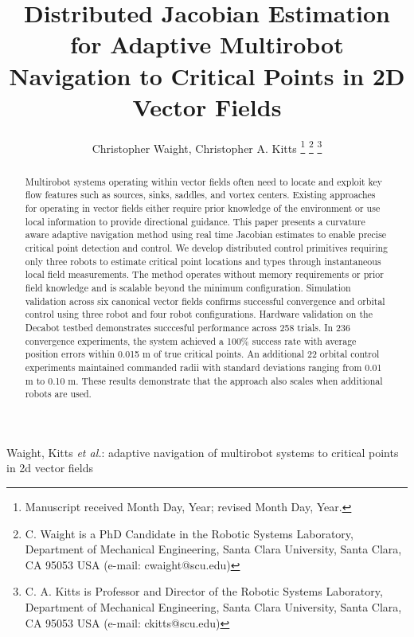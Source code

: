 \documentclass[lettersize,journal]{IEEEtran}
\begin{document}
\title{Distributed Jacobian Estimation for Adaptive Multirobot Navigation to Critical Points in 2D Vector Fields}
\author{Christopher Waight, Christopher A. Kitts 
\thanks{Manuscript received Month Day, Year; revised Month Day, Year.}
\thanks{C. Waight is a PhD Candidate in the Robotic Systems Laboratory, Department of Mechanical Engineering, Santa Clara University, Santa Clara, CA 95053 USA (e-mail: cwaight@scu.edu)}
\thanks{C. A. Kitts is Professor and Director of the Robotic Systems Laboratory, Department of Mechanical Engineering, Santa Clara University, Santa Clara, CA 95053 USA (e-mail: ckitts@scu.edu)}
}
%
{Waight, Kitts \MakeLowercase{\textit{et al.}: Adaptive Navigation of Multirobot Systems to Critical Points in 2D Vector Fields}}


\maketitle

\begin{abstract}
    Multirobot systems operating within vector fields often need to locate and exploit key flow features such as sources, sinks, saddles, and vortex centers. Existing approaches for operating in vector fields either require prior knowledge of the environment or use local information to provide directional guidance. This paper presents a curvature aware adaptive navigation method using real time Jacobian estimates to enable precise critical point detection and control. We develop distributed control primitives requiring only three robots to estimate critical point locations and types through instantaneous local field measurements. The method operates without memory requirements or prior field knowledge and is scalable  beyond the minimum configuration. Simulation validation across six canonical vector fields confirms successful convergence and orbital control using three robot and four robot configurations. Hardware validation on the Decabot testbed demonstrates succcesful performance across 258 trials. In 236 convergence experiments, the system achieved a 100\% success rate with average position errors within 0.015 m of true critical points. An additional 22 orbital control experiments maintained commanded radii with standard deviations ranging from 0.01 m to 0.10 m. These results demonstrate that the approach also scales when additional robots are used.

\end{abstract}
\end{document}
